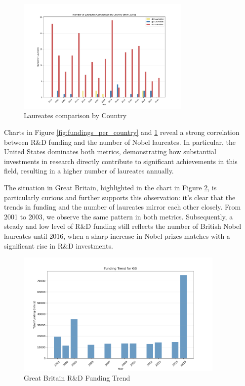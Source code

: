 \documentclass{article}
\begin{document}
\begin{figure}[H]
	\centering
	\includegraphics[width=0.75\textwidth]{../queries/plots/laureates_comparison_by_country.png}
	\caption{Laureates comparison by Country}
	\label{fig:laureates_per_country}
\end{figure}

Charts in Figure \ref{fig:fundings_per_country} and \ref{fig:laureates_per_country} reveal a strong correlation between R\&D
funding and the number of Nobel laureates. In particular, the United States dominates both metrics, demonstrating
how substantial investments in research directly contribute to significant achievements in this field, resulting
in a higher number of laureates annually.

The situation in Great Britain, highlighted in the chart in Figure \ref{fig:gb_fundings}, is particularly curious
and further supports this observation: it's clear that the trends in funding and the number of laureates mirror each other closely. From 2001 to 2003,
we observe the same pattern in both metrics. Subsequently, a steady and low level of R\&D funding still reflects
the number of British Nobel laureates until 2016, when a sharp increase in Nobel prizes matches with a significant
rise in R\&D investments.

\begin{figure}[H]
	\centering
	\includegraphics[width=0.9\textwidth]{../queries/plots/gb_funding_trend_bar.png}
	\caption{Great Britain R\&D Funding Trend}
	\label{fig:gb_fundings}
\end{figure}
\end{document}
